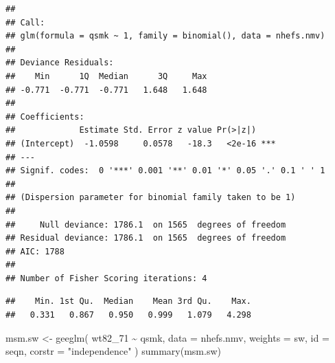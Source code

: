\documentclass[
  10pt,
]{book}
\newenvironment{Shaded}{\begin{snugshade}}{\end{snugshade}}
\newcommand{\AttributeTok}[1]{\textcolor[rgb]{0.77,0.63,0.00}{#1}}
\newcommand{\DecValTok}[1]{\textcolor[rgb]{0.00,0.00,0.81}{#1}}
\newcommand{\FunctionTok}[1]{\textcolor[rgb]{0.00,0.00,0.00}{#1}}
\newcommand{\NormalTok}[1]{#1}
\newcommand{\OtherTok}[1]{\textcolor[rgb]{0.56,0.35,0.01}{#1}}
\newcommand{\SpecialCharTok}[1]{\textcolor[rgb]{0.00,0.00,0.00}{#1}}
\newcommand{\StringTok}[1]{\textcolor[rgb]{0.31,0.60,0.02}{#1}}
\begin{document}
\begin{verbatim}
## 
## Call:
## glm(formula = qsmk ~ 1, family = binomial(), data = nhefs.nmv)
## 
## Deviance Residuals: 
##    Min      1Q  Median      3Q     Max  
## -0.771  -0.771  -0.771   1.648   1.648  
## 
## Coefficients:
##             Estimate Std. Error z value Pr(>|z|)    
## (Intercept)  -1.0598     0.0578   -18.3   <2e-16 ***
## ---
## Signif. codes:  0 '***' 0.001 '**' 0.01 '*' 0.05 '.' 0.1 ' ' 1
## 
## (Dispersion parameter for binomial family taken to be 1)
## 
##     Null deviance: 1786.1  on 1565  degrees of freedom
## Residual deviance: 1786.1  on 1565  degrees of freedom
## AIC: 1788
## 
## Number of Fisher Scoring iterations: 4
\end{verbatim}

\begin{Shaded}
\end{Shaded}

\begin{verbatim}
##    Min. 1st Qu.  Median    Mean 3rd Qu.    Max. 
##   0.331   0.867   0.950   0.999   1.079   4.298
\end{verbatim}

\begin{Shaded}
\begin{Highlighting}[]
\NormalTok{msm.sw }\OtherTok{\textless{}{-}} \FunctionTok{geeglm}\NormalTok{(}
\NormalTok{  wt82\_71 }\SpecialCharTok{\textasciitilde{}}\NormalTok{ qsmk,}
  \AttributeTok{data =}\NormalTok{ nhefs.nmv,}
  \AttributeTok{weights =}\NormalTok{ sw,}
  \AttributeTok{id =}\NormalTok{ seqn,}
  \AttributeTok{corstr =} \StringTok{"independence"}
\NormalTok{)}
\FunctionTok{summary}\NormalTok{(msm.sw)}
\end{Highlighting}
\end{Shaded}
\end{document}
